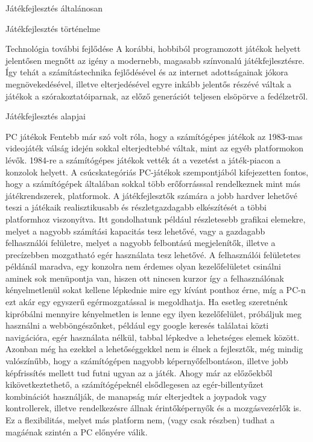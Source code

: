 \begin{MyChapter}{Játékfejlesztés általánosan}
\begin{MySection}{Játékfejlesztés történelme}
\begin{MySubSection}{Technológia további fejlődése}
			A korábbi, hobbiból programozott játékok helyett jelentősen megnőtt az igény a modernebb, magasabb színvonalú játékfejlesztésre. 
			Így tehát a számítástechnika fejlődésével és az internet adottságainak jókora megnövekedésével, illetve elterjedésével egyre inkább jelentős részévé váltak a játékok a szórakoztatóiparnak, az előző generációt teljesen elsöpörve a fedélzetről.
		\end{MySubSection}
				
	\end{MySection}

	\begin{MySection}{Játékfejlesztés alapjai} 
		
		\begin{MySubSection}{PC játékok}
			Fentebb már szó volt róla, hogy a számítógépes játékok az 1983-mas videojáték válság idején sokkal elterjedtebbé váltak, mint az egyéb platformokon lévők. 1984-re a számítógépes játékok vették át a vezetést a játék-piacon a konzolok helyett.
			A csúcskategóriás PC-játékok szempontjából kifejezetten fontos, hogy a számítógépek általában sokkal több erőforrásssal rendelkeznek mint más játékrendszerek, platformok. A játékfejlesztők számára a jobb hardver lehetővé teszi a játékaik realisztikusabb és részletgazdagabb elkészítését a többi platformhoz viszonyítva. Itt gondolhatunk például részletesebb grafikai elemekre, melyet a nagyobb számítási kapacitás tesz lehetővé, vagy a gazdagabb felhasználói felületre, melyet a nagyobb felbontású megjelenítők, illetve a precízebben mozgatható egér használata tesz lehetővé. A felhasználói felületetes példánál maradva, egy konzolra nem érdemes olyan kezelőfelületet csinálni aminek sok menüpontja van, hiszen ott nincsen kurzor így a felhasználónak kényelmetlenül sokat kellene lépkednie mire egy kívánt ponthoz érne, míg a PC-n ezt akár egy egyszerű egérmozgatással is megoldhatja.
			Ha esetleg szeretnénk kipróbálni mennyire kényelmetlen is lenne egy ilyen kezelőfelület, próbáljuk meg használni a webböngészőnket, például egy google keresés találatai közti navigációra, egér használata nélkül, tabbal lépkedve a lehetséges elemek között.
			Azonban még ha ezekkel a lehetőséggekkel nem is élnek a fejlesztők, még mindig valószínűbb, hogy a számítógépen nagyobb képernyőfelbontáson, illetve jobb képfrissítés mellett tud futni ugyan az a játék.
			Ahogy már az előzőekből kikövetkeztethető, a számítógépeknél elsődlegesen az egér-billentyűzet kombinációt használják, de manapság már elterjedtek a joypadok vagy kontrollerek, illetve rendelkezésre állnak érintőképernyők és a mozgásvezérlők is. Ez a flexibilitás, melyet más platform nem, (vagy csak részben) tudhat a magáénak szintén a PC előnyére válik. 
		\end{MySubSection}
	

\end{MySection}
\end{MyChapter}
